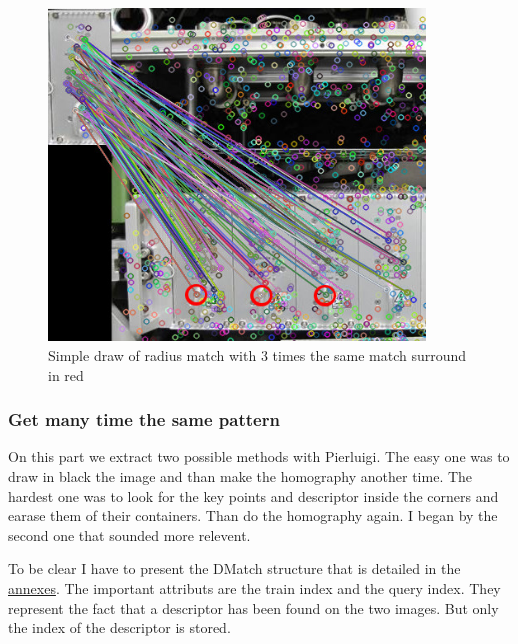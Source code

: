 	
	\begin{figure}[h]
		\begin{center}
			\includegraphics[width=10cm]{images_not_compressed/matches.jpg}
			\caption{Simple draw of radius match with 3 times the same match surround in red}
			\label{matches}	
		\end{center}
	\end{figure}
	
	\subsubsection[Multiple pattern]{Get many time the same pattern}

	\par On this part we extract two possible methods with Pierluigi. The easy one was to draw in black the image and than make the homography another time. The hardest one was to look for the key points and descriptor inside the corners and earase them of their containers. Than do the homography again. I began by the second one that sounded more relevent. 
	
	\par To be clear I have to present the DMatch structure that is detailed in the \hyperlink{structDMatch}{annexes}. The important attributs are the train index and the query index. They represent the fact that a descriptor has been found on the two images. But only the index of the descriptor is stored.
	
